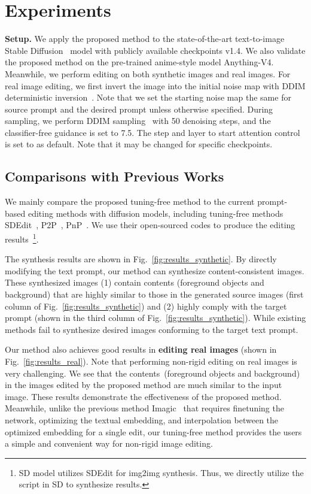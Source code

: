 \documentclass[10pt,twocolumn,letterpaper]{article}
\begin{document}
\section{Experiments}
\noindent\textbf{Setup.}
We apply the proposed method to the state-of-the-art text-to-image Stable Diffusion~\cite{rombach2022high} model with publicly available checkpoints v1.4. We also validate the proposed method on the pre-trained anime-style model Anything-V4. Meanwhile, we perform editing on both synthetic images and real images. For real image editing, we first invert the image into  the initial noise map with DDIM deterministic inversion~\cite{song2020denoising}. Note that we set the starting noise map the same for source prompt  and the desired prompt  unless otherwise specified. During sampling, we perform DDIM sampling~\cite{song2020denoising} with 50 denoising steps, and the classifier-free guidance is set to 7.5. The step and layer to start attention control is set to  as default. Note that it may be changed for specific checkpoints.

\subsection{Comparisons with Previous Works}
We mainly compare the proposed tuning-free method to the current prompt-based editing methods with diffusion models, including tuning-free methods SDEdit~\cite{meng2021sdedit}, P2P~\cite{hertz2022prompt}, PnP~\cite{tumanyan2022plug}. We use their open-sourced codes to produce the editing results~\footnote{SD model utilizes SDEdit for img2img synthesis. Thus, we directly utilize the script in SD to synthesize results.}. 

The synthesis results are shown in Fig.~\ref{fig:results_synthetic}. By directly modifying the text prompt, our method can synthesize content-consistent images. These synthesized images (1) contain contents (foreground objects and background) that are highly similar to those in the generated source images (first column  of Fig.~\ref{fig:results_synthetic}) and (2) highly comply with the target prompt  (shown in the third column of Fig.~\ref{fig:results_synthetic}). While existing methods fail to synthesize desired images conforming to the target text prompt.

Our method also achieves good results in \textbf{editing real images} (shown in Fig.~\ref{fig:results_real}). Note that performing non-rigid editing on real images is very challenging. 
We see that the contents~(foreground objects and background) in the images edited by the proposed method are much similar to the input image. These results demonstrate the effectiveness of the proposed method. Meanwhile, unlike the previous method Imagic~\cite{kawar2022imagic} that requires finetuning the network, optimizing the textual embedding, and interpolation between the optimized embedding for a single edit, our tuning-free method provides the users a simple and convenient way for non-rigid image editing.
\end{document}
